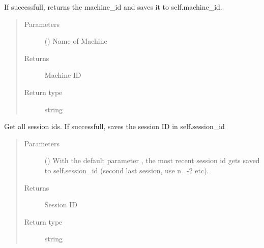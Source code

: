 \documentclass[letterpaper,10pt,english,openany,oneside]{sphinxmanual}
\begin{document}
\begin{fulllineitems}
\begin{fulllineitems}
If successfull, returns the machine\_id and saves it to self.machine\_id.
\begin{quote}\begin{description}
\item[{Parameters}] \leavevmode
{} () \textendash{} Name of Machine

\item[{Returns}] \leavevmode
Machine ID

\item[{Return type}] \leavevmode
string

\end{description}\end{quote}

\end{fulllineitems}


\begin{fulllineitems}
\label{\detokenize{_modules/AconitySTUDIO_client:AconitySTUDIO_client.AconitySTUDIO_client.get_session_id}}
Get all session ids. If successfull, saves the session ID in self.session\_id
\begin{quote}\begin{description}
\item[{Parameters}] \leavevmode
{} () \textendash{} With the default parameter , the most recent session id gets saved to self.session\_id (second last session, use n=-2 etc).

\item[{Returns}] \leavevmode
Session ID

\item[{Return type}] \leavevmode
string

\end{description}\end{quote}

\end{fulllineitems}



\end{fulllineitems}
\end{document}
